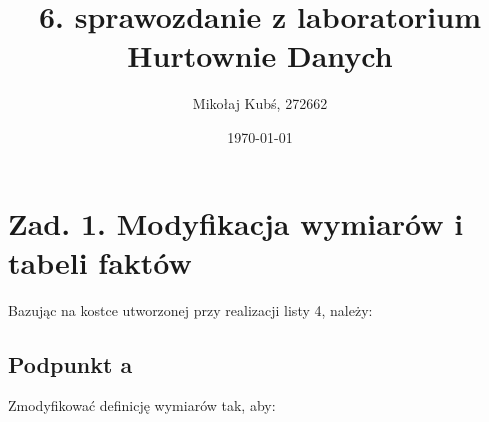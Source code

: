 \documentclass[a4paper,12pt]{article}
\title{6. sprawozdanie z laboratorium Hurtownie Danych}
\author{Mikołaj Kubś, 272662}
\date{\today}
\begin{document}
\maketitle

\section{Zad. 1. Modyfikacja wymiarów i tabeli faktów}

Bazując na kostce utworzonej przy realizacji listy 4, należy:

\subsection{Podpunkt a}

Zmodyfikować definicję wymiarów tak, aby:
\end{document}
